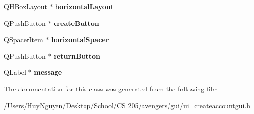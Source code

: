 \begin{DoxyCompactItemize}
\item 
Q\+H\+Box\+Layout $\ast$ {\bfseries horizontal\+Layout\+\_}\hypertarget{classUi__CreateAccountGUI_aa80ca5e0766c8a2a28d9b2857712cabf}{}\label{classUi__CreateAccountGUI_aa80ca5e0766c8a2a28d9b2857712cabf}

\item 
Q\+Push\+Button $\ast$ {\bfseries create\+Button}\hypertarget{classUi__CreateAccountGUI_a08d5b56081693083fc47fa943df3104b}{}\label{classUi__CreateAccountGUI_a08d5b56081693083fc47fa943df3104b}

\item 
Q\+Spacer\+Item $\ast$ {\bfseries horizontal\+Spacer\+\_}\hypertarget{classUi__CreateAccountGUI_a808824fc5a7252e539dde7d432959da7}{}\label{classUi__CreateAccountGUI_a808824fc5a7252e539dde7d432959da7}

\item 
Q\+Push\+Button $\ast$ {\bfseries return\+Button}\hypertarget{classUi__CreateAccountGUI_ad506e993b34ca31517faababf92acb40}{}\label{classUi__CreateAccountGUI_ad506e993b34ca31517faababf92acb40}

\item 
Q\+Label $\ast$ {\bfseries message}\hypertarget{classUi__CreateAccountGUI_a038585f3cbec2c711b864c3815277bf7}{}\label{classUi__CreateAccountGUI_a038585f3cbec2c711b864c3815277bf7}

\end{DoxyCompactItemize}


The documentation for this class was generated from the following file\+:\begin{DoxyCompactItemize}
\item 
/\+Users/\+Huy\+Nguyen/\+Desktop/\+School/\+C\+S 205/avengers/gui/ui\+\_\+createaccountgui.\+h\end{DoxyCompactItemize}
